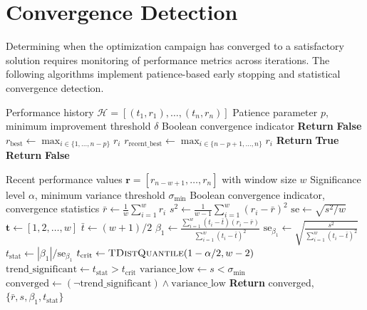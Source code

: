 \section{Convergence Detection}
\label{sec:convergence}

Determining when the optimization campaign has converged to a satisfactory solution requires monitoring of performance metrics across iterations. The following algorithms implement patience-based early stopping and statistical convergence detection.

\begin{algorithm}[H]
\caption{Convergence Detection with Patience}
\label{alg:convergence_patience}
\begin{algorithmic}[1]
\Require Performance history $\mathcal{H} = [(t_1, r_1), \ldots, (t_n, r_n)]$
\Require Patience parameter $p$, minimum improvement threshold $\delta$
\Ensure Boolean convergence indicator
    \State \textbf{Return} \textbf{False} 
\EndIf
\State $r_{\text{best}} \gets \max_{i \in \{1, \ldots, n-p\}} r_i$
\State $r_{\text{recent\_best}} \gets \max_{i \in \{n-p+1, \ldots, n\}} r_i$
    \State \textbf{Return} \textbf{True} 
\Else
    \State \textbf{Return} \textbf{False}
\EndIf
\end{algorithmic}
\end{algorithm}

\begin{algorithm}[H]
\caption{Statistical Convergence Test}
\label{alg:convergence_statistical}
\begin{algorithmic}[1]
\Require Recent performance values $\mathbf{r} = [r_{n-w+1}, \ldots, r_n]$ with window size $w$
\Require Significance level $\alpha$, minimum variance threshold $\sigma_{\min}$
\Ensure Boolean convergence indicator, convergence statistics
\State $\bar{r} \gets \frac{1}{w} \sum_{i=1}^{w} r_i$ 
\State $s^2 \gets \frac{1}{w-1} \sum_{i=1}^{w} (r_i - \bar{r})^2$ 
\State $\text{se} \gets \sqrt{s^2 / w}$ 
\State {}
\State $\mathbf{t} \gets [1, 2, \ldots, w]$
\State $\bar{t} \gets (w + 1) / 2$
\State $\beta_1 \gets \frac{\sum_{i=1}^{w} (t_i - \bar{t})(r_i - \bar{r})}{\sum_{i=1}^{w} (t_i - \bar{t})^2}$ 
\State $\text{se}_{\beta_1} \gets \sqrt{\frac{s^2}{\sum_{i=1}^{w} (t_i - \bar{t})^2}}$
\State $t_{\text{stat}} \gets |\beta_1| / \text{se}_{\beta_1}$
\State $t_{\text{crit}} \gets \Call{TDistQuantile}{1 - \alpha/2, w-2}$
\State {}
\State $\text{trend\_significant} \gets t_{\text{stat}} > t_{\text{crit}}$
\State $\text{variance\_low} \gets s < \sigma_{\min}$
\State $\text{converged} \gets (\neg \text{trend\_significant}) \wedge \text{variance\_low}$
\State \textbf{Return} converged, $\{\bar{r}, s, \beta_1, t_{\text{stat}}\}$
\end{algorithmic}
\end{algorithm}

